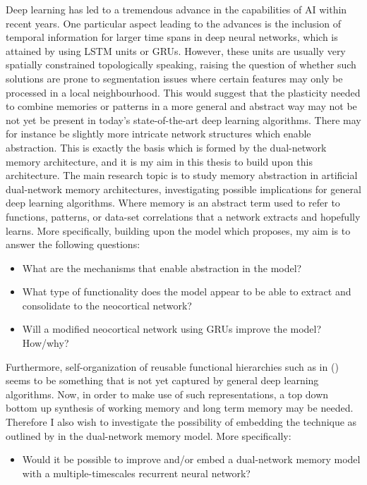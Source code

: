 Deep learning has led to a tremendous advance in the capabilities of AI within recent years. One particular aspect leading to the advances is the inclusion of temporal information for larger time spans in deep neural networks, which is attained by using LSTM units or GRUs. However, these units are usually very spatially constrained topologically speaking, raising the question of whether such solutions are prone to segmentation issues where certain features may only be processed in a local neighbourhood. This would suggest that the plasticity needed to combine memories or patterns in a more general and abstract way may not be not yet be present in today's state-of-the-art deep learning algorithms. There may for instance be slightly more intricate network structures which enable abstraction. This is exactly the basis which is formed by the dual-network memory architecture, and it is my aim in this thesis to build upon this architecture. 
The main research topic is to study memory abstraction in artificial dual-network memory architectures, investigating possible implications for general deep learning algorithms. Where memory is an abstract term used to refer to functions, patterns, or data-set correlations that a network extracts and hopefully learns. More specifically, building upon the model which \cite{Hattori2014} proposes, my aim is to answer the following questions:
\begin{itemize}
\item What are the mechanisms that enable abstraction in the model?
\item What type of functionality does the model appear to be able to extract and consolidate to the neocortical network?
\item Will a modified neocortical network using GRUs improve the model? How/why?
\end{itemize}

Furthermore, self-organization of reusable functional hierarchies such as in (\cite{Tani2014}) seems to be something that is not yet captured by general deep learning algorithms. Now, in order to make use of such representations, a top down bottom up synthesis of working memory and long term memory may be needed. Therefore I also wish to investigate the possibility of embedding the technique as outlined by \cite{Tani2014} in the dual-network memory model. More specifically:
\begin{itemize}
\item Would it be possible to improve and/or embed a dual-network memory model with a multiple-timescales recurrent neural network?
\end{itemize}

